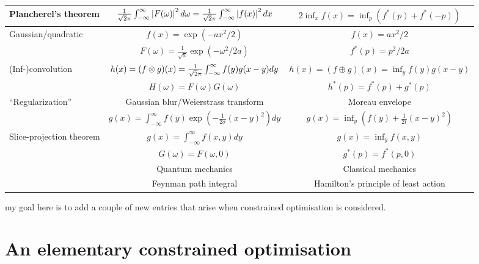 \documentclass[10pt]{article}
\begin{document}
\begin{tabular}{| l | c | c |}
\hline

Plancherel's theorem & $\frac{1}{\sqrt2\pi}\int_{-\infty}^{\infty}\left|F(\omega)\right|^2d\omega = \frac{1}{\sqrt2\pi}\int_{-\infty}^{\infty}\left|f(x)\right|^2dx$ & $2\inf_x f(x) = \inf_p(f^\ast(p)+f^\ast(-p))$ \\

\hline

Gaussian/quadratic & $f(x) = \exp(-ax^2/2)$ & $f(x) = ax^2/2$ \\
& $F(\omega) = \frac{1}{\sqrt{a}}\exp(-\omega^2/2a)$ & $f^\ast(p) = p^2/2a$ \\

\hline

(Inf-)convolution & $h(x) = (f\otimes g)(x) = \frac{1}{\sqrt2\pi}\int_{-\infty}^{\infty} f(y)g(x-y)dy$ & $h(x) = (f\oplus g)(x) = \inf_y f(y)g(x-y)$ \\
& $H(\omega) = F(\omega)G(\omega)$ & $h^\ast(p) = f^\ast(p)+g^\ast(p)$ \\

\hline

``Regularization'' & Gaussian blur/Weierstrass transform & Moreau envelope \\
  & $g(x) = \int_{-\infty}^\infty f(y)\exp(-\frac{1}{2\sigma}(x-y)^2)dy$
& $g(x) = \inf_y(f(y) + \frac{1}{2t}(x-y)^2)$ \\

\hline

Slice-projection theorem & $g(x)=\int_{-\infty}^\infty f(x,y)dy$ & $g(x)=\inf_y f(x,y)$ \\

& $G(\omega) = F(\omega,0)$ & $g^\ast(p) = f^\ast(p,0)$ \\
\hline

& Quantum mechanics & Classical mechanics \\

\hline

& Feynman path integral & Hamilton's principle of least action \\

\hline

\end{tabular}

my goal here is to add a couple of new entries that arise when constrained optimisation is considered.

\section{An elementary constrained optimisation}
\label{sec:opt}
\end{document}
